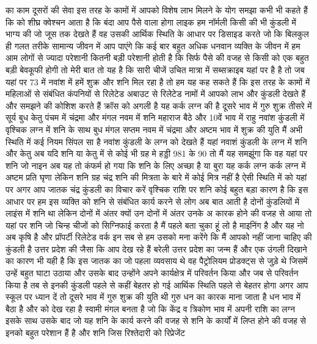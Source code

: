 का काम दूसरों की सेवा इस तरह के कामों
में आपको विशेष लाभ मिलने के योग समझा कभी
भी कहते हैं कि को शीघ्र क्वेश्चन आता है कि बंदा आप पैसे वाला
होगा लाइक हम नॉर्मली किसी की भी कुंडली में भाग्य की जो जूस तक देखते हैं वह उसकी
आर्थिक स्थिति के आधार पर डिसाइड करते जो कि बिलकुल ही गलत तरीके सामान्य जीवन में आप पाएंगे कि कई बार बहुत अधिक धनवान
व्यक्ति के जीवन में हम आम लोगों से ज्यादा परेशानी कितनी बड़ी परेशानी होती
है कि सिर्फ पैसे की वजह से किसी को एक बहुत बड़ी बेवकूफी होगी तो मेरी बात तो यह
है कि सारी चीजें उचित मात्रा में
सब्सक्राइब यहां पर है
है तो जब यहां पर 73 में नवांश में हमें शुक्र और शनि मिल रहा है तो हम यह कह सकते हैं कि इस तरह के कामों में महिलाओं से
संबंधित कंपनियों से रिलेटेड अबाउट से रिलेटेड नामों में आपको लाभ और कुंडली
देखते हैं और समझने की कोशिश करते हैं क्रॉस को अगली है यह कर्क लग्न की है दूसरे भाव में गुरु शुक्र तीसरे में सूर्य
बुध केतु पंचम में चंद्रमा और मंगल नवम में शनि महाराज बैठे और 10वें भाव में
राहु नवांश कुंडली में वृश्चिक लग्न में शनि के साथ बुध मंगल सप्तम नवम में
चंद्रमा और अष्टम भाव में शुक्र की युति मैं अभी स्थिति में कई नियम सिंपल सा है
नवांश कुंडली के लग्न को देखते हैं यहां नवाशं कुंडली के लग्न में शनि और केतु अब यदि शनि या केतु में से कोई भी ग्रह मे
हड्डी 981 के 90 तो मैं यह समझूंगा कि वह
यहां पर शनि जो नाइन अब यह तो कंफर्म हो
गया कि शनि के लिए अच्छा है या बुरा यह
कर्क लग्न कर्क लग्न में अष्टम प्रति घृणा
लेकिन शनि ग्रह चंद्र शनि की मित्रता के बारे में कोई मित्र नहीं है ऐसी स्थिति
में को यहां पर अगर आप जातक चंद्र कुंडली का विचार करें वृश्चिक राशि पर शनि कोई
बहुत बड़ा कारण है कि इस आधार पर हम इस व्यक्ति को शनि से संबंधित कार्य करने से लोग अब बात आती है
दोनों कुंडलियों में लाइंस में शनि था लेकिन दोनों में अंतर क्यों उन दोनों में अंतर उनके अ कारक होने की वजह से आया तो
यहां पर शनि जो चिन्ह चीजों को सिग्निफाई करता है मैं पहले बता चुका हूं लो है माइनिंग है और यह नो अब कृषि है और
प्रॉपर्टी रिलेटेड वर्क इन सब से हम उसको मना करेंगे कि मैं आपको नहीं जाना चाहिए
की कुंडली है उत्तर प्रदेश की जैसा कि आप देख रहे हैं बरेली उत्तर प्रदेश का जन्म हैं और एक उंगली दिखाने का कारण भी यही है
कि इस जातक का जो पहला व्यवसाय थे वह पैट्रोलियम प्रोडक्ट्स से जुड़े थे जिसमें उन्हें बहुत घाटा उठाया और उसके बाद
उन्होंने अपने कार्यक्षेत्र में परिवर्तन किया और जब से परिवर्तन किया है तब से इनकी कुंडली पहले से कहीं बेहतर हो गई
आर्थिक स्थिति पहले से बेहतर होगा अगर आप स्कूल पर ध्यान दें तो दूसरे भाव में गुरु शुक्र की युति थी गुरु धन का कारक माना
जाता है धन भाव में बैठा है और को देख रहा है स्वामी मंगल बनता है जो कि केंद्र व
त्रिकोण भाव में अपनी राशि का लग्न इसके साथ उसके बाद जो यह शनि के कार्य करने की
वजह से शनि के कार्यों में लिप्त होने की वजह से इनको बहुत परेशान हैं है और शनि जिस रिश्तेदारी को रिप्रेजेंट
